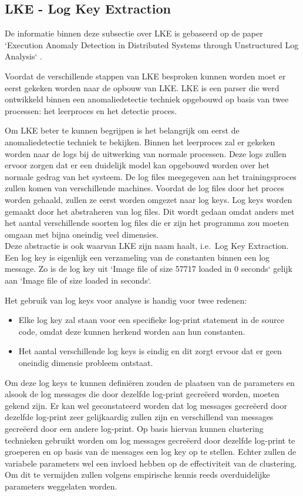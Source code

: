 \subsection{LKE - Log Key Extraction}
De informatie binnen deze subsectie over LKE is gebaseerd op de paper `Execution Anomaly Detection in Distributed Systems through Unstructured Log Analysis` \autocite{fu2009execution}.

Voordat de verschillende stappen van LKE besproken kunnen worden moet er eerst gekeken worden naar de opbouw van LKE. LKE is een parser die werd ontwikkeld binnen een anomaliedetectie techniek opgebouwd op basis van twee processen: het leerproces en het detectie proces. 

Om LKE beter te kunnen begrijpen is het belangrijk om eerst de anomaliedetectie techniek te bekijken. Binnen het leerproces zal er gekeken worden naar de logs bij de uitwerking van normale processen. Deze logs zullen ervoor zorgen dat er een duidelijk model kan opgebouwd worden over het normale gedrag van het systeem. De log files meegegeven aan het trainingsproces zullen komen van verschillende machines. Voordat de log files door het proces worden gehaald, zullen ze eerst worden omgezet naar log keys. Log keys worden gemaakt door het abstraheren van log files. Dit wordt gedaan omdat anders met het aantal verschillende soorten log files die er zijn het programma zou moeten omgaan met bijna oneindig veel dimensies.\\

Deze abstractie is ook waarvan LKE zijn naam haalt, i.e.\ Log Key Extraction. Een log key is eigenlijk een verzameling van de constanten binnen een log message. Zo is de log key uit `Image file of size 57717 loaded in 0 seconds` gelijk aan `Image file of size loaded in seconds`. 

Het gebruik van log keys voor analyse is handig voor twee redenen: 
\begin{itemize}
    \item Elke log key zal staan voor een specifieke log-print statement in de source code, omdat deze kunnen herkend worden aan hun constanten.
    \item Het aantal verschillende log keys is eindig en dit zorgt ervoor dat er geen oneindig dimensie probleem ontstaat.
\end{itemize}

Om deze log keys te kunnen definiëren zouden de plaatsen van de parameters en alsook de log messages die door dezelfde log-print gecreëerd worden, moeten gekend zijn. Er kan wel geconstateerd worden dat log messages gecreëerd door dezelfde log-print zeer gelijkaardig zullen zijn en verschillend van messages gecreëerd door een andere log-print. Op basis hiervan kunnen clustering technieken gebruikt worden om log messages gecreëerd door dezelfde log-print te groeperen en op basis van de messages een log key op te stellen. Echter zullen de variabele parameters wel een invloed hebben op de effectiviteit van de clustering. Om dit te vermijden zullen volgens empirische kennis reeds overduidelijke parameters weggelaten worden. 

